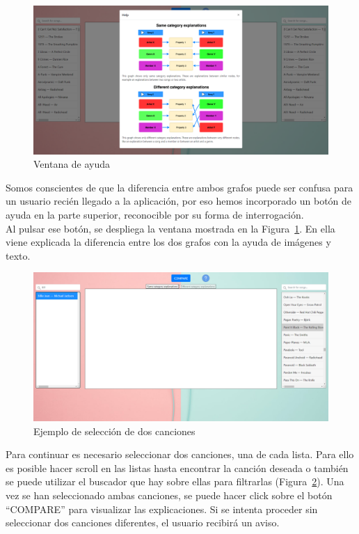 \begin{figure}[h!]
	\centering
	\includegraphics[width = 1\textwidth]{Imagenes/Bitmap/Pantalla modal.png}
	\caption{Ventana de ayuda}
	\label{fig:ayuda}
\end{figure}

Somos conscientes de que la diferencia entre ambos grafos puede ser confusa para un usuario recién llegado a la aplicación, por eso hemos incorporado un botón de ayuda en la parte superior, reconocible por su forma de interrogación.\\

Al pulsar ese botón, se despliega la ventana mostrada en la Figura~\ref{fig:ayuda}. En ella viene explicada la diferencia entre los dos grafos con la ayuda de imágenes y texto.\\

\begin{figure}[h!]
	\centering
	\includegraphics[width = 1\textwidth]{Imagenes/Bitmap/Pantalla seleccion.png}
	\caption{Ejemplo de selección de dos canciones}
	\label{fig:seleccion}
\end{figure}

Para continuar es necesario seleccionar dos canciones, una de cada lista. Para ello es posible hacer scroll en las listas hasta encontrar la canción deseada o también se puede utilizar el buscador que hay sobre ellas para filtrarlas (Figura~\ref{fig:seleccion}). Una vez se han seleccionado ambas canciones, se puede hacer click sobre el botón ``COMPARE'' para visualizar las explicaciones. Si se intenta proceder sin seleccionar dos canciones diferentes, el usuario recibirá un aviso.\\

